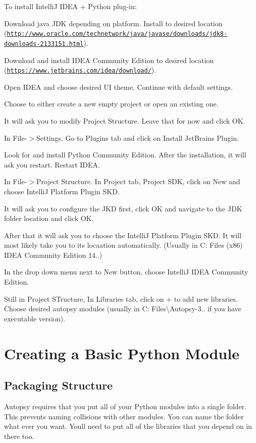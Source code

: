 To install IntelliJ I\+D\+EA + Python plug-\/in\+:
\begin{DoxyEnumerate}
\item Download java J\+DK depending on platform. Install to desired location (\href{http://www.oracle.com/technetwork/java/javase/downloads/jdk8-downloads-2133151.html}{\tt http\+://www.\+oracle.\+com/technetwork/java/javase/downloads/jdk8-\/downloads-\/2133151.\+html}).
\item Download and install I\+D\+EA Community Edition to desired location (\href{https://www.jetbrains.com/idea/download/}{\tt https\+://www.\+jetbrains.\+com/idea/download/}).
\item Open I\+D\+EA and choose desired UI theme. Continue with default settings.
\item Choose to either create a new empty project or open an existing one.
\item It will ask you to modify Project Structure. Leave that for now and click OK.
\item In File-\/$>$Settings. Go to Plugins tab and click on Install Jet\+Brains Plugin.
\item Look for and install Python Community Edition. After the installation, it will ask you restart. Restart I\+D\+EA.
\item In File-\/$>$Project Structure. In Project tab, Project S\+DK, click on New and choose IntelliJ Platform Plugin S\+KD.
\item It will ask you to configure the J\+KD first, click OK and navigate to the J\+DK folder location and click OK.
\item After that it will ask you to choose the IntelliJ Platform Plugin S\+KD. It will most likely take you to it\textquotesingle{}s locaation automatically. (Usually in C\+: Files (x86) I\+D\+EA Community Edition 14..)
\item In the drop down menu next to New button, choose IntelliJ I\+D\+EA Community Edition.
\item Still in Project S\+Tructure, In Libraries tab, click on \textquotesingle{}+\textquotesingle{} to add new libraries. Choose desired autopsy modules (usually in C\+: Files\textbackslash{}\+Autopsy-\/3.. if you have executable version).
\end{DoxyEnumerate}\hypertarget{mod_dev_py_page_mod_dev_py_create}{}\section{Creating a Basic Python Module}\label{mod_dev_py_page_mod_dev_py_create}
\hypertarget{mod_dev_py_page_mod_dev_py_create_dir}{}\subsection{Packaging Structure}\label{mod_dev_py_page_mod_dev_py_create_dir}
Autopsy requires that you put all of your Python modules into a single folder. This prevents naming collisions with other modules. You can name the folder what ever you want. You\textquotesingle{}ll need to put all of the libraries that you depend on in there too.


